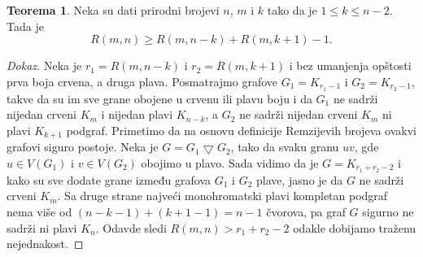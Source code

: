 \documentclass{article}
\theoremstyle{definition}
\newtheorem{teorema}{Teorema}[section]
\newcommand{\dokaz}[1]{\begin{proof}[Dokaz]#1\end{proof}}
\begin{document}
	\begin{teorema}\label{dot3}
	Neka su dati prirodni brojevi $n$, $m$ i $k$ tako da je $1\leq k \leq n - 2$. Tada je $$R(m,n) \geq R(m, n - k) + R(m, k + 1) - 1.$$ 
	\dokaz{
		Neka je $r_1 = R(m, n - k)$ i $r_2 = R(m, k + 1)$ i bez umanjenja opštosti prva boja crvena, a druga plava. Posmatrajmo grafove 
		$G_1 =K_{r_1 - 1}$ i $G_2 = K_{r_2 - 1}$, takve da su im sve grane obojene u crvenu ili plavu boju i da $G_1$ ne sadrži nijedan crveni $K_m$ i
		nijedan plavi $K_{n - k}$, a $G_2$ ne sadrži nijedan crveni $K_m$ ni plavi $K_{k + 1}$ podgraf. Primetimo da na osnovu definicije Remzijevih
		brojeva ovakvi grafovi siguro postoje. Neka je $G = G_1 \bigtriangledown G_2$, tako da svaku granu $uv$, gde $u \in V(G_1)$ i $v \in V(G_2)$
		obojimo u plavo. Sada vidimo da je $G = K_{r_1 + r_2 - 2}$ i kako su sve dodate grane između grafova $G_1$ i $G_2$ plave, jasno je da $G$ ne
		sadrži crveni $K_m$. Sa druge strane najveći monohromatski plavi kompletan podgraf nema više od $(n - k - 1) + (k + 1 - 1) = n - 1$ čvorova, pa 			graf $G$ sigurno ne sadrži ni plavi $K_n$. Odavde sledi $R(m,n) > r_1 + r_2 - 2$ odakle dobijamo traženu nejednakost. 
	}
	\end{teorema}
\end{document}
